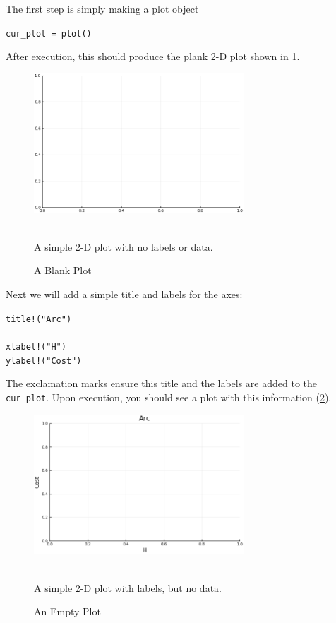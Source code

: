 The first step is simply making a plot object

\begin{addmargin}[1.5em]{1.5em}
\texttt{cur\_plot = plot()}
\end{addmargin}

After execution, this should produce the plank 2-D plot shown in \cref{fig:example_1}.

\begin{figure}
	\centering
	\includegraphics[width=0.7\textwidth]{images/example_1}
	\caption{A Blank Plot} ~\\
	\small A simple 2-D plot with no labels or data. 
	\label{fig:example_1}
\end{figure}

Next we will add a simple title and labels for the axes:

\begin{addmargin}[1.5em]{1.5em}
\texttt{title!("Arc") \\ ~ \\
xlabel!("H") \\
ylabel!("Cost")
}
\end{addmargin}

The exclamation marks ensure this title and the labels are added to the \texttt{cur\_plot}. Upon execution, you should see a plot with this information (\cref{fig:example_2}).

\begin{figure}
	\centering
	\includegraphics[width=0.7\textwidth]{images/example_2}
	\caption{An Empty Plot} ~\\
	\small A simple 2-D plot with labels, but no data. 
	\label{fig:example_2}
\end{figure}

